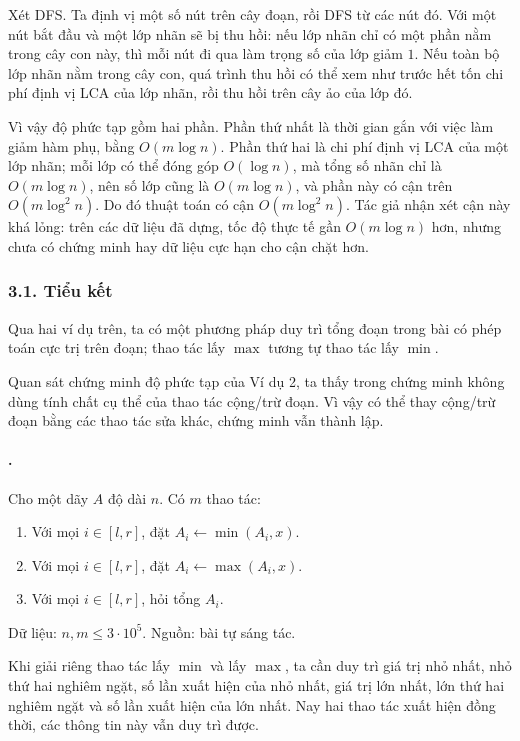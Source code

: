 \documentclass[11pt]{article}
\begin{document}
Xét DFS. Ta định vị một số nút trên cây đoạn, rồi DFS từ các nút đó. Với một
nút bắt đầu và một lớp nhãn sẽ bị thu hồi: nếu lớp nhãn chỉ có một phần nằm
trong cây con này, thì mỗi nút đi qua làm trọng số của lớp giảm \(1\). Nếu
toàn bộ lớp nhãn nằm trong cây con, quá trình thu hồi có thể xem như trước
hết tốn chi phí định vị LCA của lớp nhãn, rồi thu hồi trên cây ảo của lớp đó.

Vì vậy độ phức tạp gồm hai phần. Phần thứ nhất là thời gian gắn với việc làm
giảm hàm phụ, bằng \(O(m\log n)\). Phần thứ hai là chi phí định vị LCA của
một lớp nhãn; mỗi lớp có thể đóng góp \(O(\log n)\), mà tổng số nhãn chỉ là
\(O(m\log n)\), nên số lớp cũng là \(O(m\log n)\), và phần này có cận trên
\(O(m\log^2 n)\). Do đó thuật toán có cận \(O(m\log^2 n)\). Tác giả nhận xét
cận này khá lỏng: trên các dữ liệu đã dựng, tốc độ thực tế gần \(O(m\log n)\)
hơn, nhưng chưa có chứng minh hay dữ liệu cực hạn cho cận chặt hơn.

\subsubsection*{3.1. Tiểu kết}

Qua hai ví dụ trên, ta có một phương pháp duy trì tổng đoạn trong bài có phép
toán cực trị trên đoạn; thao tác lấy \(\max\) tương tự thao tác lấy \(\min\).

Quan sát chứng minh độ phức tạp của Ví dụ 2, ta thấy trong chứng minh không
dùng tính chất cụ thể của thao tác cộng/trừ đoạn. Vì vậy có thể thay cộng/trừ
đoạn bằng các thao tác sửa khác, chứng minh vẫn thành lập.

\paragraph{.}
Cho một dãy \(A\) độ dài \(n\). Có \(m\) thao tác:
\begin{enumerate}
  \item Với mọi \(i\in[l,r]\), đặt \(A_i\leftarrow \min(A_i,x)\).
  \item Với mọi \(i\in[l,r]\), đặt \(A_i\leftarrow \max(A_i,x)\).
  \item Với mọi \(i\in[l,r]\), hỏi tổng \(A_i\).
\end{enumerate}
Dữ liệu: \(n,m\le 3\cdot 10^5\). Nguồn: bài tự sáng tác.

Khi giải riêng thao tác lấy \(\min\) và lấy \(\max\), ta cần duy trì giá trị
nhỏ nhất, nhỏ thứ hai nghiêm ngặt, số lần xuất hiện của nhỏ nhất, giá trị lớn
nhất, lớn thứ hai nghiêm ngặt và số lần xuất hiện của lớn nhất. Nay hai thao
tác xuất hiện đồng thời, các thông tin này vẫn duy trì được.
\end{document}
